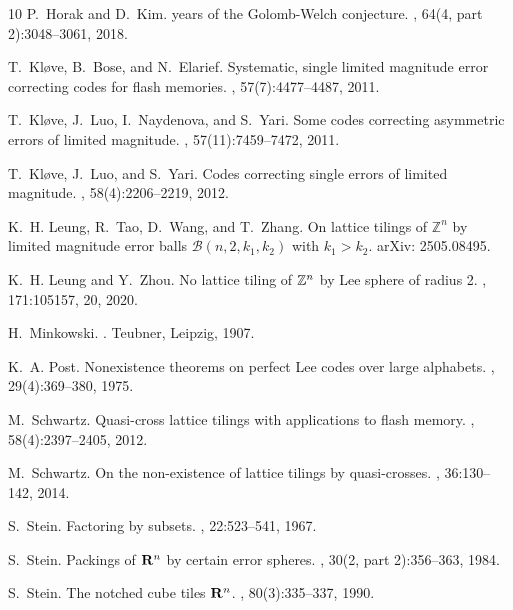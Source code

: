 \documentclass[12pt]{article}
\begin{document}
\begin{thebibliography}{10}
	P.~Horak and D.~Kim.
	 years of the {G}olomb-{W}elch conjecture.
	, 64(4, part 2):3048--3061, 2018.
	
	T.~{Kl\o ve}, B.~{Bose}, and N.~{Elarief}.
	\newblock Systematic, single limited magnitude error correcting codes for flash
	memories.
	, 57(7):4477--4487, 2011.
	
	T.~Kl{\o}ve, J.~Luo, I.~Naydenova, and S.~Yari.
	\newblock Some codes correcting asymmetric errors of limited magnitude.
	, 57(11):7459--7472, 2011.
	
	T.~Kl{\o}ve, J.~Luo, and S.~Yari.
	\newblock Codes correcting single errors of limited magnitude.
	, 58(4):2206--2219, 2012.
	
	K.~H. Leung, R.~Tao, D.~Wang, and T.~Zhang.
	\newblock On lattice tilings of {$\mathbb{Z}^n$} by limited magnitude error
	balls {$\mathcal{B}(n,2,k_1,k_2)$} with $k_1>k_2$.
	\newblock arXiv: 2505.08495.
	
	K.~H. Leung and Y.~Zhou.
	\newblock No lattice tiling of {$\Bbb{Z}^n$} by {L}ee sphere of radius 2.
	, 171:105157, 20, 2020.
	
	H.~Minkowski.
	.
	\newblock Teubner, Leipzig, 1907.
	
	K.~A. Post.
	\newblock Nonexistence theorems on perfect {L}ee codes over large alphabets.
	, 29(4):369--380, 1975.
	
	M.~Schwartz.
	\newblock Quasi-cross lattice tilings with applications to flash memory.
	, 58(4):2397--2405, 2012.
	
	M.~Schwartz.
	\newblock On the non-existence of lattice tilings by quasi-crosses.
	, 36:130--142, 2014.
	
	S.~Stein.
	\newblock Factoring by subsets.
	, 22:523--541, 1967.
	
	S.~Stein.
	\newblock Packings of {${\bf R}^{n}$} by certain error spheres.
	, 30(2, part 2):356--363, 1984.
	
	S.~Stein.
	\newblock The notched cube tiles {${\bf R}^n$}.
	, 80(3):335--337, 1990.
	

\end{thebibliography}
\end{document}
